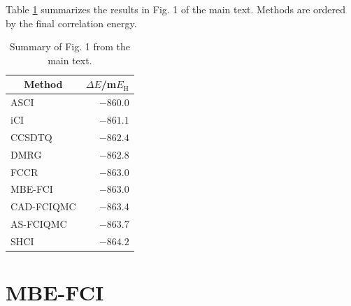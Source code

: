 \documentclass[journal=jcp,manuscript=suppinfo]{achemso}
\begin{document}
Table \ref{results_SI_table} summarizes the results in Fig. 1 of the main text. Methods are ordered by the final correlation energy.
%
\begin{table}[ht]
\begin{center}
\caption{Summary of Fig. 1 from the main text.}
\label{results_SI_table}
\begin{tabular}{l|r}
\toprule
\multicolumn{1}{c|}{Method} & \multicolumn{1}{c}{$\Delta E$/m$E_{\text{H}}$} \\
\midrule\midrule
ASCI & $-860.0$ \\
iCI & $-861.1$ \\
CCSDTQ & $-862.4$ \\
DMRG & $-862.8$ \\
FCCR & $-863.0$ \\
MBE-FCI & $-863.0$ \\
CAD-FCIQMC & $-863.4$ \\
AS-FCIQMC & $-863.7$ \\
SHCI & $-864.2$ \\
\midrule
\end{tabular}
\vspace{-1.4cm}
\end{center}
\end{table}
%

\section{MBE-FCI}
\end{document}
